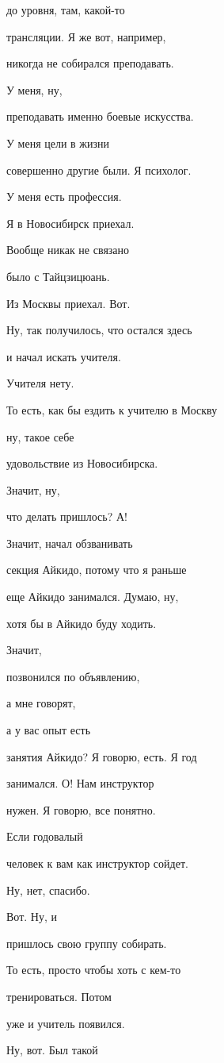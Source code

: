 до уровня, там, какой-то

трансляции. Я же вот, например,

никогда не собирался преподавать.

У меня, ну,

преподавать именно боевые искусства.

У меня цели в жизни

совершенно другие были. Я психолог.

У меня есть профессия.

Я в Новосибирск приехал.

Вообще никак не связано

было с Тайцзицюань.

Из Москвы приехал. Вот.

Ну, так получилось, что остался здесь

и начал искать учителя.

Учителя нету.

То есть, как бы ездить к учителю в Москву

ну, такое себе

удовольствие из Новосибирска.

Значит, ну,

что делать пришлось? А!

Значит, начал обзванивать

секция Айкидо, потому что я раньше

еще Айкидо занимался. Думаю, ну,

хотя бы в Айкидо буду ходить.

Значит,

позвонился по объявлению,

а мне говорят,

а у вас опыт есть

занятия Айкидо? Я говорю, есть. Я год

занимался. О! Нам инструктор

нужен. Я говорю, все понятно.

Если годовалый

человек к вам как инструктор сойдет.

Ну, нет, спасибо.

Вот. Ну, и

пришлось свою группу собирать.

То есть, просто чтобы хоть с кем-то

тренироваться. Потом

уже и учитель появился.

Ну, вот. Был такой

